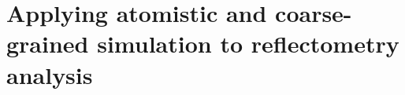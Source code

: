 
\chapter{Applying atomistic and coarse-grained simulation to reflectometry analysis} %

\label{reflectometry2} %




\pagebreak





